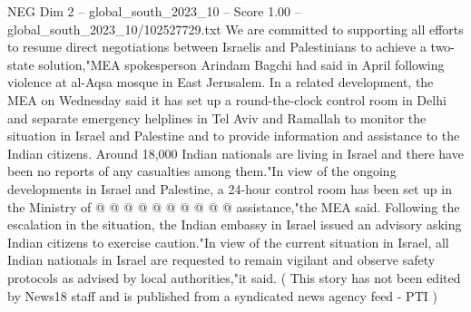 \begin{textsample}{NEG Dim 2 – global\_south\_2023\_10 – Score 1.00 – global\_south\_2023\_10/102527729.txt}
We are committed to supporting all efforts to resume direct negotiations between Israelis and Palestinians to achieve a two-state solution,"MEA spokesperson Arindam Bagchi had said in April following violence at al-Aqsa mosque in East Jerusalem.
In a related development, the MEA on Wednesday said it has set up a round-the-clock control room in Delhi and separate emergency helplines in Tel Aviv and Ramallah to monitor the situation in Israel and Palestine and to provide information and assistance to the Indian citizens.
Around 18,000 Indian nationals are living in Israel and there have been no reports of any casualties among them."In view of the ongoing developments in Israel and Palestine, a 24-hour control room has been set up in the Ministry of @ @ @ @ @ @ @ @ @ @ assistance,"the MEA said.
Following the escalation in the situation, the Indian embassy in Israel issued an advisory asking Indian citizens to exercise caution."In view of the current situation in Israel, all Indian nationals in Israel are requested to remain vigilant and observe safety protocols as advised by local authorities,"it said. ( This story has not been edited by News18 staff and is published from a syndicated news agency feed - PTI )

\end{textsample}

